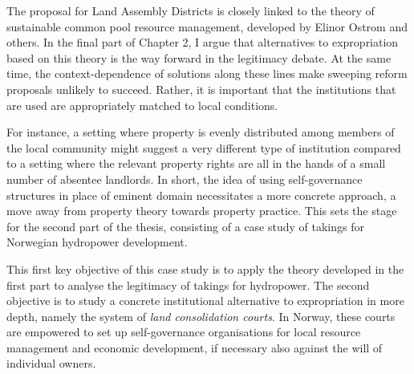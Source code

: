 The proposal for Land Assembly Districts is closely linked to the theory of sustainable common pool resource management, developed by Elinor Ostrom and others. In the final part of Chapter 2, I argue that alternatives to expropriation based on this theory is the way forward in the legitimacy debate. At the same time, the context-dependence of solutions along these lines make sweeping reform proposals unlikely to succeed. Rather, it is important that the institutions that are used are appropriately matched to local conditions. 

For instance, a setting where property is evenly distributed among members of the local community might suggest a very different type of institution compared to a setting where the relevant property rights are all in the hands of a small number of absentee landlords. In short, the idea of using self-governance structures in place of eminent domain necessitates a more concrete approach, a move away from property theory towards property practice. This sets the stage for the second part of the thesis, consisting of a case study of takings for Norwegian hydropower development. 

This first key objective of this case study is to apply the theory developed in the first part to analyse the legitimacy of takings for hydropower. The second objective is to study a concrete institutional alternative to expropriation in more depth, namely the system of {\it land consolidation courts}. In Norway, these courts are empowered to set up self-governance organisations for local resource management and economic development, if necessary also against the will of individual owners.



